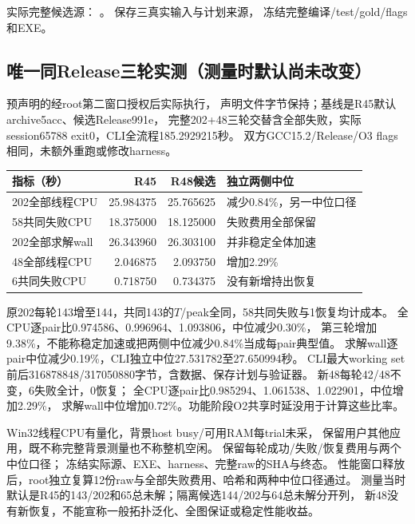 \documentclass[UTF8,fontset=fandol,11pt]{ctexart}
\begin{document}
实际完整候选源：
。
保存三真实输入与计划来源，
冻结完整编译/test/gold/flags和EXE。
\subsection{唯一同Release三轮实测（测量时默认尚未改变）}
预声明的经root第二窗口授权后实际执行，
声明文件字节保持；基线是R45默认archive5acc、候选Release991e，
完整202+48三轮交替含全部失败，实际session65788 exit0，CLI全流程185.2929215秒。
双方GCC15.2/Release/O3 flags相同，未额外重跑或修改harness。
\begin{tabularx}{\textwidth}{L{4.1cm}rrX}
\toprule
指标（秒） & R45 & R48候选 & 独立两侧中位\\
\midrule
202全部线程CPU &25.984375&25.765625&减少0.84\%，另一中位口径\\
58共同失败CPU &18.375000&18.125000&失败费用全部保留\\
202全部求解wall &26.343960&26.303100&并非稳定全体加速\\
48全部线程CPU &2.046875&2.093750&增加2.29\%\\
6共同失败CPU &0.718750&0.734375&没有新增持出恢复\\
\bottomrule
\end{tabularx}

原202每轮143增至144，共同143的$T$/peak全同，58共同失败与1恢复均计成本。
全CPU逐pair比0.974586、0.996964、1.093806，中位减少0.30\%，
第三轮增加9.38\%，不能称稳定加速或把两侧中位减少0.84\%当成每pair典型值。
求解wall逐pair中位减少0.19\%，CLI独立中位27.531782至27.650994秒。
CLI最大working set前后316878848/317050880字节，含数据、保存计划与验证器。
新48每轮42/48不变，6失败全计，0恢复；
全CPU逐pair比0.985294、1.061538、1.022901，中位增加2.29\%，
求解wall中位增加0.72\%。功能阶段O2共享时延没用于计算这些比率。

Win32线程CPU有量化，背景host busy/可用RAM每trial未采，
保留用户其他应用，既不称完整背景测量也不称整机空闲。
保留每轮成功/失败/恢复费用与两个中位口径；
冻结实际源、EXE、harness、完整raw的SHA与终态。
性能窗口释放后，root独立复算12份raw与全部失败费用、哈希和两种中位口径通过。
测量当时默认是R45的143/202和65总未解；隔离候选144/202与64总未解分开列，
新48没有新恢复，不能宣称一般拓扑泛化、全图保证或稳定性能收益。
\end{document}
